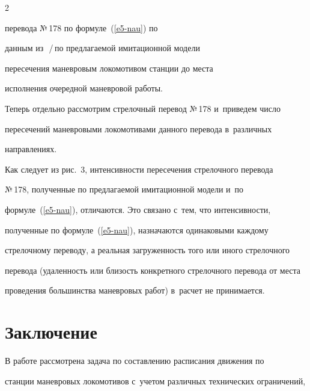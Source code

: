\begin{multicols}{2}
{{{перевода №\,178 по формуле~(\ref{e5-nau}) по 


данным из~\cite{7-nau}\,/\,по предлагаемой имитационной модели}}


\vspace*{9pt}


}





\noindent 


пересечения маневровым локомотивом станции до места 


исполнения очередной маневровой работы.


      


Теперь отдельно рассмотрим стрелочный перевод №\,178 и~приведем число 


пересечений маневровыми локомотивами данного перевода в~различных 


направлениях.





  Как следует из рис.~3, интенсивности пересечения стрелочного перевода 


№\,178, полученные по предлагаемой имитационной модели и~по 


формуле~(\ref{e5-nau}), отличаются. Это связано с~тем, что интенсивности, 


полученные по формуле~(\ref{e5-nau}), назначаются одинаковыми каждому 


стрелочному переводу, а реальная загруженность того или иного стрелочного 


перевода (удаленность или близость конкретного стрелочного перевода от места 


проведения большинства маневровых работ) в~расчет не принимается.





\section{Заключение}


\vspace*{-2pt}





 В работе рассмотрена задача по составлению расписания движения по 


станции маневровых локомотивов с~учетом различных технических ограничений, 



\end{multicols}
